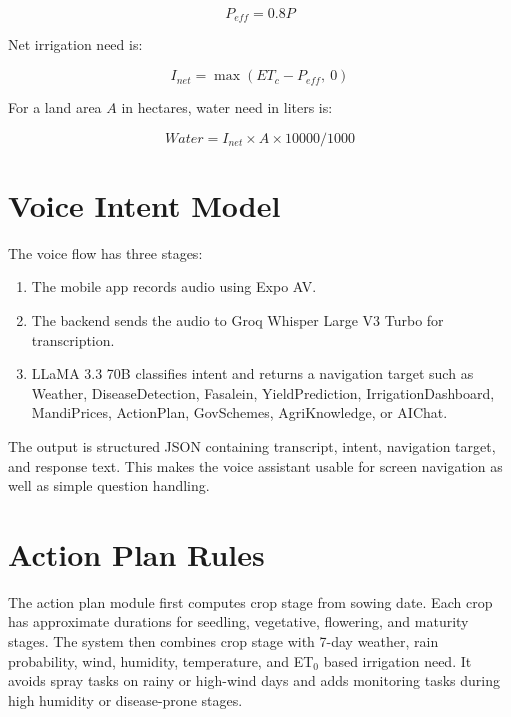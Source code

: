 \documentclass[12pt,a4paper]{report}
\begin{document}
\begin{equation}
P_{eff} = 0.8P
\end{equation}

Net irrigation need is:

\begin{equation}
I_{net} = \max(ET_c - P_{eff},\ 0)
\end{equation}

For a land area $A$ in hectares, water need in liters is:

\begin{equation}
Water = I_{net} \times A \times 10000 / 1000
\end{equation}

\section{Voice Intent Model}

The voice flow has three stages:

\begin{enumerate}[leftmargin=1.5em]
  \item The mobile app records audio using Expo AV.
  \item The backend sends the audio to Groq Whisper Large V3 Turbo for transcription.
  \item LLaMA 3.3 70B classifies intent and returns a navigation target such as Weather, DiseaseDetection, Fasalein, YieldPrediction, IrrigationDashboard, MandiPrices, ActionPlan, GovSchemes, AgriKnowledge, or AIChat.
\end{enumerate}

The output is structured JSON containing transcript, intent, navigation target, and response text. This makes the voice assistant usable for screen navigation as well as simple question handling.

\section{Action Plan Rules}

The action plan module first computes crop stage from sowing date. Each crop has approximate durations for seedling, vegetative, flowering, and maturity stages. The system then combines crop stage with 7-day weather, rain probability, wind, humidity, temperature, and ET$_0$ based irrigation need. It avoids spray tasks on rainy or high-wind days and adds monitoring tasks during high humidity or disease-prone stages.

\singlespacing
\end{document}
